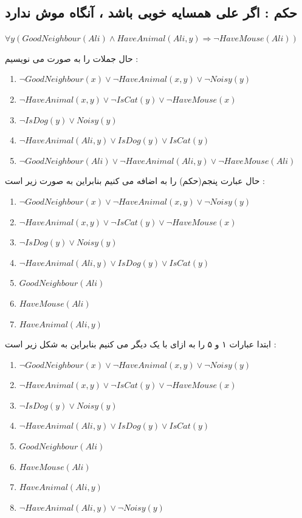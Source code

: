 \documentclass{article}
\begin{document}
\subsection*{حکم : اگر علی همسایه خوبی باشد ، آنگاه موش ندارد }
\begin{center}
	$ \forall y (GoodNeighbour(Ali)  \land HaveAnimal(Ali,y)\Rightarrow \neg HaveMouse(Ali))$
\end{center}
حال جملات را به صورت 
می نویسیم  : 
\begin{center}
	\begin{enumerate}
		\item $ \neg GoodNeighbour(x) \lor\neg HaveAnimal(x,y)  \lor  \neg Noisy(y)$
		\item $ \neg HaveAnimal(x,y) \lor \neg IsCat(y)\lor \neg HaveMouse(x)$
		\item $ \neg IsDog(y) \lor Noisy(y)$
		\item $ \neg HaveAnimal(Ali,y) \lor IsDog(y) \lor IsCat(y)$
		\item \textbf{$ \neg GoodNeighbour(Ali) \lor \neg HaveAnimal(Ali,y) \lor \neg HaveMouse(Ali)$}
	\end{enumerate}
\end{center}
حال 
عبارت پنجم(حکم)  را به 
اضافه می کنیم بنابراین 
به صورت زیر است  : 
\begin{center}
	\begin{enumerate}
		\item $ \neg GoodNeighbour(x) \lor\neg HaveAnimal(x,y)  \lor \neg Noisy(y)$
		\item $ \neg HaveAnimal(x,y) \lor \neg IsCat(y)\lor \neg HaveMouse(x)$
		\item $ \neg IsDog(y) \lor Noisy(y)$
		\item $ \neg HaveAnimal(Ali,y) \lor IsDog(y) \lor IsCat(y)$
		\item $ GoodNeighbour(Ali)$
		\item $HaveMouse(Ali)$
		\item $HaveAnimal(Ali,y)$
	\end{enumerate}
\end{center}
ابتدا عبارات ۱ و ۵ را به ازای 
با یک دیگر 
می کنیم بنابراین 
به شکل زیر است  : 
\begin{center}
	\begin{enumerate}
		\item $ \neg GoodNeighbour(x) \lor\neg HaveAnimal(x,y)  \lor \neg Noisy(y)$
		\item $ \neg HaveAnimal(x,y) \lor \neg IsCat(y)\lor \neg HaveMouse(x)$
		\item $ \neg IsDog(y) \lor Noisy(y)$
		\item $ \neg HaveAnimal(Ali,y) \lor IsDog(y) \lor IsCat(y)$
		\item $ GoodNeighbour(Ali)$
		\item $HaveMouse(Ali)$
		\item $HaveAnimal(Ali,y)$
		\item $\neg HaveAnimal(Ali,y) \lor \neg Noisy(y)$
	\end{enumerate}
\end{center}
\end{document}
